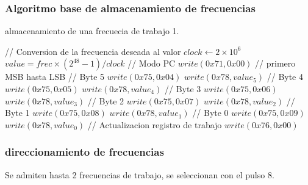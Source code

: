 \subsubsection{Algoritmo base de almacenamiento de frecuencias}
\begin{algorithm}[H]
    \caption{almacenamiento de una frecuecia de trabajo 1.}\label{algo_frec}
    \begin{algorithmic}[1]
    \State // {Conversion de la frecuencia deseada al valor}
    \State $clock \gets 2 \times 10^{6}$
    \State $value = frec \times (2^{48} -1 ) / clock $
    \State // {Modo PC}
    \State $write(0x71, 0x00)$
    \State // {primero MSB hasta LSB}
    \State // {Byte 5}
    \State $write(0x75, 0x04)$ 
    \State $write(0x78, value_5)$
    \State // {Byte 4}
    \State $write(0x75, 0x05)$ 
    \State $write(0x78, value_4)$
    \State // {Byte 3}
    \State $write(0x75, 0x06)$ 
    \State $write(0x78, value_3)$
    \State // {Byte 2}
    \State $write(0x75, 0x07)$ 
    \State $write(0x78, value_2)$
    \State // {Byte 1}
    \State $write(0x75, 0x08)$ 
    \State $write(0x78, value_1)$
    \State // {Byte 0}
    \State $write(0x75, 0x09)$ 
    \State $write(0x78, value_0)$
    \State // {Actualizacion registro de trabajo}
    \State $write(0x76, 0x00)$
    \EndProcedure
    \end{algorithmic}
\end{algorithm}

\subsubsection{direccionamiento de frecuencias}
Se admiten hasta 2 frecuencias de trabajo, se seleccionan con el pulso 8.

\newpage
